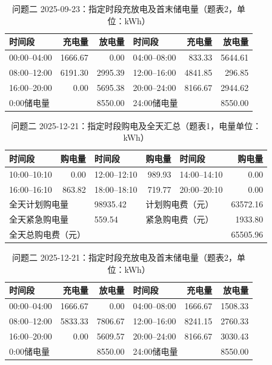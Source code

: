 \begin{table}[H]
\centering\footnotesize
\setlength{\tabcolsep}{4pt}
\caption{问题二 2025-09-23：指定时段充放电及首末储电量（题表2，单位：kWh）}
\label{tab:required-q2-2025-09-23-storage}
\begin{tabular}{@{}lrrlrr@{}}
\toprule
时间段 & 充电量 & 放电量 & 时间段 & 充电量 & 放电量 \\
\midrule
00:00--04:00 & 1666.67 & 0.00 & 04:00--08:00 & 833.33 & 5644.61 \\
08:00--12:00 & 6191.30 & 2995.39 & 12:00--16:00 & 4841.85 & 296.85 \\
16:00--20:00 & 0.00 & 5695.38 & 20:00--24:00 & 8166.67 & 2944.62 \\
\multicolumn{2}{l}{0:00储电量} & 8550.00 & \multicolumn{2}{l}{24:00储电量} & 8550.00 \\
\bottomrule
\end{tabular}
\end{table}

\FloatBarrier
\begin{table}[H]
\centering\footnotesize
\setlength{\tabcolsep}{4pt}
\caption{问题二 2025-12-21：指定时段购电及全天汇总（题表1，电量单位：kWh）}
\label{tab:required-q2-2025-12-21-grid}
\begin{tabular}{@{}lrlrlr@{}}
\toprule
时间段 & 购电量 & 时间段 & 购电量 & 时间段 & 购电量 \\
\midrule
10:00--10:10 & 0.00 & 12:00--12:10 & 989.93 & 14:00--14:10 & 0.00 \\
16:00--16:10 & 863.82 & 18:00--18:10 & 719.77 & 20:00--20:10 & 0.00 \\
\multicolumn{2}{l}{全天计划购电量} & 98935.42 & \multicolumn{2}{l}{计划购电费（元）} & 63572.16 \\
\multicolumn{2}{l}{全天紧急购电量} & 559.54 & \multicolumn{2}{l}{紧急购电费（元）} & 1933.80 \\
\multicolumn{5}{l}{全天总购电费（元）} & 65505.96 \\
\bottomrule
\end{tabular}
\end{table}

\begin{table}[H]
\centering\footnotesize
\setlength{\tabcolsep}{4pt}
\caption{问题二 2025-12-21：指定时段充放电及首末储电量（题表2，单位：kWh）}
\label{tab:required-q2-2025-12-21-storage}
\begin{tabular}{@{}lrrlrr@{}}
\toprule
时间段 & 充电量 & 放电量 & 时间段 & 充电量 & 放电量 \\
\midrule
00:00--04:00 & 1666.67 & 0.00 & 04:00--08:00 & 1666.67 & 1508.33 \\
08:00--12:00 & 5833.33 & 7806.67 & 12:00--16:00 & 8241.15 & 2760.33 \\
16:00--20:00 & 0.00 & 5609.57 & 20:00--24:00 & 8166.67 & 3030.43 \\
\multicolumn{2}{l}{0:00储电量} & 8550.00 & \multicolumn{2}{l}{24:00储电量} & 8550.00 \\
\bottomrule
\end{tabular}
\end{table}

